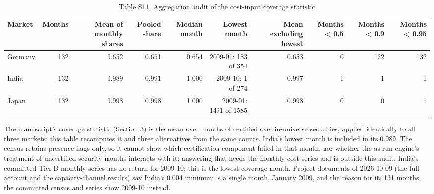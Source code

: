 \begin{table}[t]
\centering
\small
\caption{Table S11. Aggregation audit of the cost-input coverage statistic}
\label{tab:s11}
\begin{tabular}{lrrrrrrrrr}
\toprule
Market & Months & Mean of monthly shares & Pooled share & Median month & Lowest month & Mean excluding lowest & Months < 0.5 & Months < 0.9 & Months < 0.95 \\
\midrule
Germany & 132 & 0.652 & 0.651 & 0.654 & 2009-01: 183 of 354 & 0.653 & 0 & 132 & 132 \\
India & 132 & 0.989 & 0.991 & 1.000 & 2009-10: 1 of 274 & 0.997 & 1 & 1 & 1 \\
Japan & 132 & 0.998 & 0.998 & 1.000 & 2009-01: 1491 of 1585 & 0.998 & 0 & 0 & 1 \\
\bottomrule
\end{tabular}
\par\vspace{2pt}
\parbox{\textwidth}{\footnotesize The manuscript's coverage statistic (Section 3) is the mean over months of certified over in-universe securities, applied identically to all three markets; this table recomputes it and three alternatives from the same counts. India's lowest month is included in its 0.989. The census retains presence flags only, so it cannot show which certification component failed in that month, nor whether the as-run engine's treatment of uncertified security-months interacts with it; answering that needs the monthly cost series and is outside this audit. India's committed Tier B monthly series has no return for 2009-10; this is the lowest-coverage month. Project documents of 2026-10-09 (the full account and the capacity-channel results) say India's 0.004 minimum is a single month, January 2009, and the reason for its 131 months; the committed census and series show 2009-10 instead.}
\end{table}
